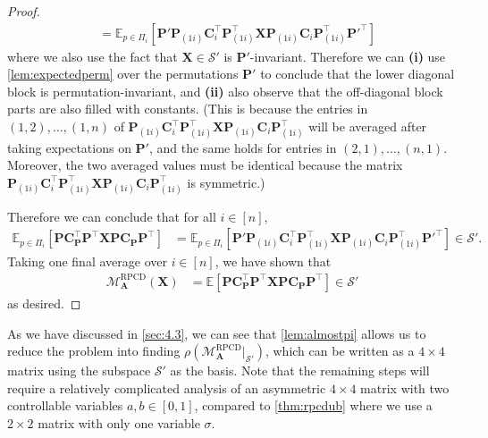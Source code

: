 \documentclass{article}
\theoremstyle{plain}
\theoremstyle{definition}
\theoremstyle{remark}
\def\bigclosed#1{\left[#1\right]}
\newcommand{\RPCD}{\text{RPCD}} %
\newcommand{\MARPCD}{\mathcal{M}_{\bm{A}}^{\RPCD}} %
\def\mC{{\bm{C}}}
\def\mP{{\bm{P}}}
\def\mX{{\bm{X}}}
\def\gS{{\mathcal{S}}}
\newcommand{\E}{\mathbb{E}}
\begin{document}
\begin{proof}
\begin{align*}
        &= \E_{p \in \Pi_{i}} \bigclosed{\mP' \mP_{(1 i)} \mC_{i}^{\top} \mP_{(1 i)}^{\top} \mX \mP_{(1 i)} \mC_{i} \mP_{(1 i)}^{\top} \mP'^{\top}}
    \end{align*}
    where we also use the fact that $\mX \in \gS'$ is $\mP'$-invariant.
    Therefore we can \textbf{(i)} use \cref{lem:expectedperm} over the permutations $\mP'$ to conclude that the lower diagonal block is permutation-invariant, and \textbf{(ii)} also observe that the off-diagonal block parts are also filled with constants.
    (This is because the entries in $(1,2), \dots, (1,n)$ of $\mP_{(1 i)} \mC_{i}^{\top} \mP_{(1 i)}^{\top} \mX \mP_{(1 i)} \mC_{i} \mP_{(1 i)}^{\top}$ will be averaged after taking expectations on $\mP'$, and the same holds for entries in $(2,1), \dots, (n,1)$.
    Moreover, the two averaged values must be identical because the matrix $\mP_{(1 i)} \mC_{i}^{\top} \mP_{(1 i)}^{\top} \mX \mP_{(1 i)} \mC_{i} \mP_{(1 i)}^{\top}$ is symmetric.)

    Therefore we can conclude that for all $i \in [n]$,
    \begin{align*}
        \E_{p \in \Pi_{i}} \bigclosed{\mP \mC_{\mP}^{\top} \mP^{\top} \mX \mP \mC_{\mP} \mP^{\top}} &= \E_{p \in \Pi_{i}} \bigclosed{\mP' \mP_{(1 i)} \mC_{i}^{\top} \mP_{(1 i)}^{\top} \mX \mP_{(1 i)} \mC_{i} \mP_{(1 i)}^{\top} \mP'^{\top}} \in \gS'.
    \end{align*}
    Taking one final average over $i \in [n]$, we have shown that
    \begin{align*}
        \MARPCD(\mX) &= \E \bigclosed{\mP \mC_{\mP}^{\top} \mP^{\top} \mX \mP \mC_{\mP} \mP^{\top}} \in \gS'
    \end{align*}
    as desired.
\end{proof}

As we have discussed in \cref{sec:4.3}, we can see that \cref{lem:almostpi} allows us to reduce the problem into finding $\rho(\MARPCD|_{\gS'})$, which can be written as a $4 \times 4$ matrix using the subspace $\gS'$ as the basis.
Note that the remaining steps will require a relatively complicated analysis of an asymmetric $4 \times 4$ matrix with two controllable variables $a, b \in [0, 1]$, compared to \cref{thm:rpcdub} where we use a $2 \times 2$ matrix with only one variable $\sigma$.
\end{document}
